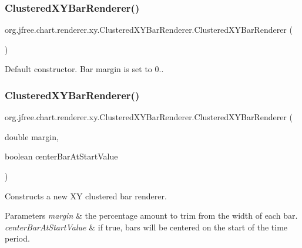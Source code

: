 \subsubsection{\texorpdfstring{Clustered\+X\+Y\+Bar\+Renderer()}{ClusteredXYBarRenderer()}\hspace{0.1cm}{\footnotesize\ttfamily [1/2]}}
{\footnotesize\ttfamily org.\+jfree.\+chart.\+renderer.\+xy.\+Clustered\+X\+Y\+Bar\+Renderer.\+Clustered\+X\+Y\+Bar\+Renderer (\begin{DoxyParamCaption}{ }\end{DoxyParamCaption})}

Default constructor. Bar margin is set to 0.. \mbox{\label{classorg_1_1jfree_1_1chart_1_1renderer_1_1xy_1_1_clustered_x_y_bar_renderer_a5e2ea7f92bbd0e649078c895c174f8cb}} 
\subsubsection{\texorpdfstring{Clustered\+X\+Y\+Bar\+Renderer()}{ClusteredXYBarRenderer()}\hspace{0.1cm}{\footnotesize\ttfamily [2/2]}}
{\footnotesize\ttfamily org.\+jfree.\+chart.\+renderer.\+xy.\+Clustered\+X\+Y\+Bar\+Renderer.\+Clustered\+X\+Y\+Bar\+Renderer (\begin{DoxyParamCaption}\item[{double}]{margin,  }\item[{boolean}]{center\+Bar\+At\+Start\+Value }\end{DoxyParamCaption})}

Constructs a new XY clustered bar renderer.


\begin{DoxyParams}{Parameters}
{\em margin} & the percentage amount to trim from the width of each bar. \\
\hline
{\em center\+Bar\+At\+Start\+Value} & if true, bars will be centered on the start of the time period. \\
\hline
\end{DoxyParams}


